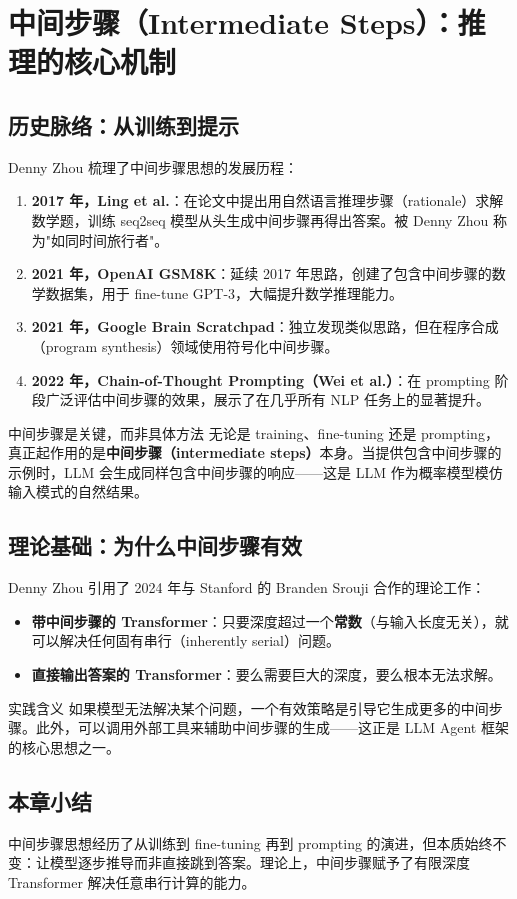 \section{中间步骤（Intermediate Steps）：推理的核心机制}

\subsection{历史脉络：从训练到提示}

Denny Zhou 梳理了中间步骤思想的发展历程：

\begin{enumerate}
    \item \textbf{2017 年，Ling et al.}：在论文中提出用自然语言推理步骤（rationale）求解数学题，训练 seq2seq 模型从头生成中间步骤再得出答案。被 Denny Zhou 称为"如同时间旅行者"。
    \item \textbf{2021 年，OpenAI GSM8K}：延续 2017 年思路，创建了包含中间步骤的数学数据集，用于 fine-tune GPT-3，大幅提升数学推理能力。
    \item \textbf{2021 年，Google Brain Scratchpad}：独立发现类似思路，但在程序合成（program synthesis）领域使用符号化中间步骤。
    \item \textbf{2022 年，Chain-of-Thought Prompting（Wei et al.）}：在 prompting 阶段广泛评估中间步骤的效果，展示了在几乎所有 NLP 任务上的显著提升。
\end{enumerate}

\begin{importantbox}{中间步骤是关键，而非具体方法}
无论是 training、fine-tuning 还是 prompting，真正起作用的是\textbf{中间步骤（intermediate steps）}本身。当提供包含中间步骤的示例时，LLM 会生成同样包含中间步骤的响应——这是 LLM 作为概率模型模仿输入模式的自然结果。
\end{importantbox}

\subsection{理论基础：为什么中间步骤有效}

Denny Zhou 引用了 2024 年与 Stanford 的 Branden Srouji 合作的理论工作：

\begin{itemize}
    \item \textbf{带中间步骤的 Transformer}：只要深度超过一个\textbf{常数}（与输入长度无关），就可以解决任何固有串行（inherently serial）问题。
    \item \textbf{直接输出答案的 Transformer}：要么需要巨大的深度，要么根本无法求解。
\end{itemize}

\begin{warningbox}{实践含义}
如果模型无法解决某个问题，一个有效策略是引导它生成更多的中间步骤。此外，可以调用外部工具来辅助中间步骤的生成——这正是 LLM Agent 框架的核心思想之一。
\end{warningbox}

\subsection{本章小结}

中间步骤思想经历了从训练到 fine-tuning 再到 prompting 的演进，但本质始终不变：让模型逐步推导而非直接跳到答案。理论上，中间步骤赋予了有限深度 Transformer 解决任意串行计算的能力。

